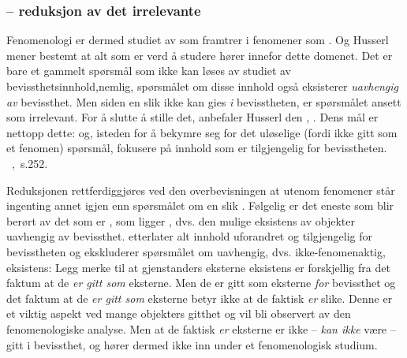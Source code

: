 \subsubsection{ -- reduksjon av det irrelevante}
Fenomenologi er dermed studiet av  som framtrer i
fenomener som . Og Husserl mener bestemt at 
alt som er verd {\aa} studere h{\o}rer innefor dette domenet. Det er 
bare et gammelt sp{\o}rsm{\aa}l som ikke kan l{\o}ses av studiet av 
bevissthetsinnhold,nemlig, sp{\o}rsm{\aa}let om disse innhold 
ogs{\aa} eksisterer {\em uavhengig av} bevissthet. Men siden en slik 
 ikke kan gies {\em i} bevisstheten, er 
sp{\o}rsm{\aa}let ansett som irrelevant. For {\aa} slutte {\aa} 
stille det, anbefaler Husserl den , 
. Dens m{\aa}l er nettopp dette:  og, isteden for {\aa} bekymre seg for det ul{\o}selige 
(fordi ikke gitt som et fenomen) sp{\o}rsm{\aa}l, fokusere p{\aa} 
innhold som er tilgjengelig for bevisstheten. ~\cite{RI},~s.252.

Reduksjonen rettferdiggj{\o}res ved den overbevisningen 
at utenom 
fenomener st{\aa}r ingenting annet igjen enn sp{\o}rsm{\aa}let om en 
slik . F{\o}lgelig er det eneste som blir 
ber{\o}rt av  det som er , som 
ligger , dvs. den mulige eksistens av objekter 
uavhengig av bevissthet.  etterlater alt innhold 
uforandret og tilgjengelig for bevisstheten og ekskluderer 
sp{\o}rsm{\aa}let om uavhengig, dvs. ikke-fenomenaktig, eksistens:
%
%
Legg merke til at gjenstanders eksterne eksistens
er forskjellig fra det faktum at de {\em er gitt 
som} eksterne. Men de er gitt som eksterne {\em for} bevissthet og 
det faktum at de {\em er gitt som} eksterne betyr ikke at de faktisk 
{\em er} slike. Denne  er et 
viktig aspekt ved mange objekters gitthet og vil bli observert av den 
fenomenologiske analyse. Men at de faktisk {\em er} eksterne er ikke 
-- {\em kan ikke} v{\ae}re -- gitt i bevissthet, og h{\o}rer dermed 
ikke inn under et fenomenologisk studium.

